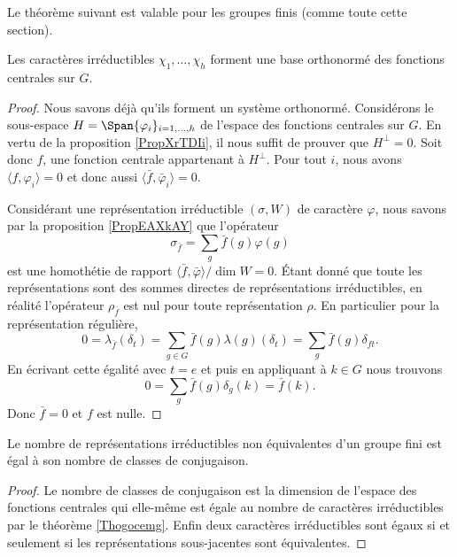 Le théorème suivant est valable pour les groupes finis (comme toute cette section).
\begin{theorem}  \label{Thogocemg}
    Les caractères irréductibles \( \chi_1,\ldots, \chi_h\) forment une base orthonormé des fonctions centrales sur \( G\).
\end{theorem}

\begin{proof}
    Nous savons déjà qu'ils forment un système orthonormé. Considérons le sous-espace \( H=\Span\{ \varphi_i \}_{i=1,\ldots, h}\) de l'espace des fonctions centrales sur \( G\). En vertu de la proposition \ref{PropXrTDIi}, il nous suffit de prouver que \( H^{\perp}=0\). Soit donc \( f\), une fonction centrale appartenant à \( H^{\perp}\). Pour tout \( i\), nous avons \( \langle f, \varphi_i\rangle =0\) et donc aussi \( \langle \bar f, \bar\varphi_i\rangle =0\).

    Considérant une représentation irréductible \( (\sigma,W)\) de caractère \( \varphi\), nous savons par la proposition \ref{PropEAXkAY} que l'opérateur
    \begin{equation}
        \sigma_{\bar f}=\sum_g\bar f(g)\varphi(g)
    \end{equation}
    est une homothétie de rapport \( \langle \bar f, \bar\varphi\rangle/\dim W=0\). Étant donné que toute les représentations sont des sommes directes de représentations irréductibles, en réalité l'opérateur \( \rho_{\bar f}\) est nul pour toute représentation \( \rho\). En particulier pour la représentation régulière,
    \begin{equation}
        0=\lambda_{\bar f}(\delta_t)=\sum_{g\in G}\bar f(g)\lambda(g)(\delta_t)=\sum_g\bar f(g)\delta_{ft}.
    \end{equation}
    En écrivant cette égalité avec \( t=e\) et puis en appliquant à \( k\in G\) nous trouvons
    \begin{equation}
        0=\sum_g\bar f(g)\delta_g(k)=\bar f(k).
    \end{equation}
    Donc \( \bar f=0\) et \( f\) est nulle.
\end{proof}

\begin{corollary}   \label{CorbdcVNC}
    Le nombre de représentations irréductibles non équivalentes d'un groupe fini est égal à son nombre de classes de conjugaison.
\end{corollary}

\begin{proof}
    Le nombre de classes de conjugaison est la dimension de l'espace des fonctions centrales qui elle-même est égale au nombre de caractères irréductibles par le théorème \ref{Thogocemg}. Enfin deux caractères irréductibles sont égaux si et seulement si les représentations sous-jacentes sont équivalentes.
\end{proof}

